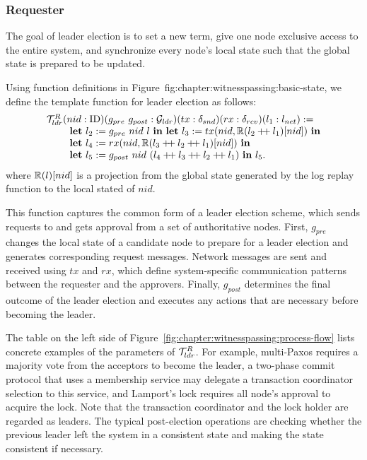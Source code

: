 \subsubsection{Requester}
The goal of leader election is to set a new term, give one node exclusive access to the
entire system, and synchronize every node's local state such that the
global state is prepared to be updated.

Using function definitions in Figure~{fig:chapter:witnesspassing:basic-state}, we define the template function for leader election as follows:
$$
\begin{array}{l}
	\ldrfunction (nid: \nodeid) (g_{pre}\ g_{post}:  \gldrfunction)
	(tx: \sendfunction)(rx: \recvfunction)(l_1  :\networklog ) := \\
\ \ \ \ \ \ \ \mbox{\textbf{let}} \ l_2 := g_{pre}\ nid \ l  \ \mbox{\textbf{in}}\ \mbox{\textbf{let}}\ l_3 := tx(nid, \replay(l_2 \mdoubleplus l_1)[nid]) \ \mbox{\textbf{in}}  \\
\ \ \ \ \ \ \ \mbox{\textbf{let}} \ l_4 := rx(nid, \replay(l_3 \mdoubleplus l_2 \mdoubleplus l_1)[nid]) \
  \mbox{\textbf{in}}\\ 
\ \ \ \ \ \ \ \mbox{\textbf{let}} \ l_5 := g_{post}\ nid \ (l_4 \mdoubleplus l_3 \mdoubleplus l_2 \mdoubleplus l_1) \ \mbox{\textbf{in}} \ l_5. \\
\end{array}
$$
where $\mathbb{R}(l)[nid]$ is a projection from the global state generated by the log replay function to 
the local stated of $nid$.

This function captures the common form of a leader election scheme, which sends requests to
and gets approval from a set of authoritative nodes.
First, $g_{pre}$ changes the local state of a candidate node to prepare
for a leader election and generates corresponding request messages.
Network messages are sent and received using $tx$ and $rx$, which define system-specific
communication patterns between the requester and the approvers.
Finally, $g_{post}$ determines the final outcome of the
leader election and executes any actions that are necessary before becoming the leader.

The table on the left side of Figure~\ref{fig:chapter:witnesspassing:process-flow} lists concrete examples of the parameters of
$\mathcal{T}^{R}_{ldr}$. For example, multi-Paxos requires a majority vote from the acceptors to
become the leader, a two-phase commit protocol that uses a membership service may delegate
a transaction coordinator selection to this service, and Lamport's lock requires all node's
approval to acquire the lock. Note that the transaction coordinator and the lock holder are
regarded as leaders. The typical post-election operations are checking whether the
previous leader left the system in a consistent state and making the state consistent
if necessary. 

